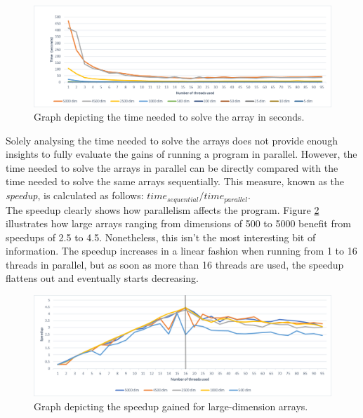 \documentclass[letterpaper,12pt]{article}
\begin{document}
\begin{figure}[h]
\centerline{\includegraphics[width=\textwidth]{report/plots/time.png}}
\caption{\label{fig:time}Graph depicting the time needed to solve the array in seconds.}
\end{figure}

Solely analysing the time needed to solve the arrays does not provide enough insights to fully evaluate the gains of running a program in parallel. However, the time needed to solve the arrays in parallel can be directly compared with the time needed to solve the same arrays sequentially. This measure, known as the \textit{speedup}, is calculated as follows: $time_{sequential} / time_{parallel}$.\\

The speedup clearly shows how parallelism affects the program. Figure \ref{fig:speedup_big} illustrates how large arrays ranging from dimensions of 500 to 5000 benefit from speedups of 2.5 to 4.5. Nonetheless, this isn't the most interesting bit of information. The speedup increases in a linear fashion when running from 1 to 16 threads in parallel, but as soon as more than 16 threads are used, the speedup flattens out and eventually starts decreasing.\\

\begin{figure}[h]
\centerline{\includegraphics[width=\textwidth]{report/plots/speedup_big.png}}
\caption{\label{fig:speedup_big}Graph depicting the speedup gained for large-dimension arrays.}
\end{figure}
\end{document}
